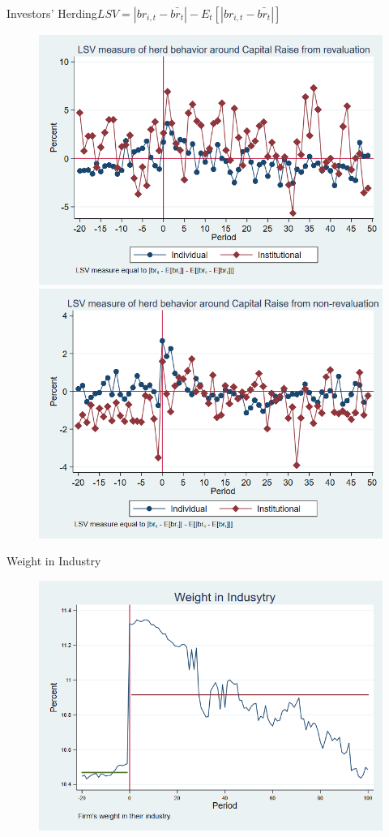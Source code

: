 \documentclass{beamer}
\begin{document}
		\begin{frame}{Investors' Herding}{$LSV =  |br_{i,t} - \bar{br_{t}}| - E_t[|br_{i,t} - \bar{br_{t}}|] $}
		\begin{figure}
			\centering
			\includegraphics[width=0.45\linewidth]{Output/IndInsHerdRevaluation.png}
			\includegraphics[width=0.45\linewidth]{Output/IndInsHerdNoRevaluation.png}
			\label{fig:IndInsHerd_Revaluation}
		\end{figure}
	\end{frame}
	
	
	
	\begin{frame}{Weight in Industry}
		\begin{figure}
			\centering
			\includegraphics[width=0.65\linewidth]{Output/weight}
			\label{fig:weight}
		\end{figure}
	\end{frame}
	
	
	
	
\end{document}
